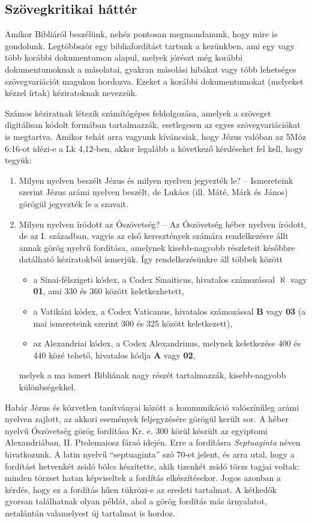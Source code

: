 \documentclass{article}
\begin{document}
\subsection{Szövegkritikai háttér}

Amikor Bibliáról beszélünk, nehéz pontosan megmondanunk, hogy mire is gondolunk. Legtöbbször
egy bibliafordítást tartunk a kezünkben, ami egy vagy több korábbi dokumentumon alapul,
melyek jórészt még korábbi dokumentumoknak a másolatai, gyakran másolási hibákat vagy
több lehetséges szövegvariációt magukon hordozva. Ezeket a korábbi dokumentumokat
(melyeket kézzel írtak) kéziratoknak nevezzük.

Számos kéziratnak létezik számítógépes feldolgozása, amelyek a szöveget
digitálisan kódolt formában tartalmazzák, esetlegesen az egyes szövegvariációkat
is megtartva. Amikor tehát arra vagyunk kíváncsiak, hogy Jézus valóban az 5Móz 6:16-ot idézi-e
a Lk 4,12-ben, akkor legalább a következő kérdéseket fel kell, hogy tegyük:
\begin{enumerate}
\item Milyen nyelven beszélt Jézus és milyen nyelven jegyezték le? -- Ismereteink szerint
Jézus arámi nyelven beszélt, de Lukács (ill. Máté, Márk és János) görögül jegyezték le a szavait.
\item Milyen nyelven íródott az Ószövetség? -- Az Ószövetség héber nyelven íródott,
de az I. században, vagyis az első keresztények számára rendelkezésre állt annak
görög nyelvű fordítása, amelynek kisebb-nagyobb részleteit későbbre datálható kéziratokból
ismerjük. Így rendelkezésünkre áll többek között
\begin{itemize}
\item a Sínai-félszigeti kódex,
a Codex Sinaiticus, hivatalos számozással $\boldsymbol{\aleph}$ vagy \textbf{01}, ami 330 és 360 között keletkezhetett,
\item a Vatikáni kódex, a Codex Vaticanus, hivatalos számozással \textbf{B} vagy \textbf{03} (a mai ismereteink szerint 300 és 325 között keletkezett),
\item az Alexandriai kódex, a Codex Alexandrinus, melynek keletkezése 400 és 440 közé tehető,
hivatalos kódja \textbf{A} vagy \textbf{02},
\end{itemize}
melyek a ma ismert Bibliának nagy részét tartalmazzák, kisebb-nagyobb különbségekkel.
\end{enumerate}
Habár Jézus és közvetlen tanítványai között a kommunikáció valószínűleg arámi nyelven zajlott,
az akkori események feljegyzésére görögül került sor. A héber nyelvű Ószövetség
görög fordítása Kr. e. 300 körül készült az egyiptomi Alexandriában, II. Ptolemaiosz fáraó idején.
Erre a fordításra \textit{Septuaginta} néven hivatkozunk.
A latin nyelvű ``septuaginta'' szó 70-et jelent, és arra utal, hogy a fordítást hetvenkét zsidó bölcs
készítette, akik tizenkét zsidó törzs tagjai voltak: minden törzset hatan képviseltek a fordítás elkészítésekor.
Jogos azonban a kérdés, hogy ez a fordítás hűen tükrözi-e az eredeti tartalmat. A kétkedők
gyorsan találhatnak olyan példát, ahol a görög fordítás más árnyalatot, netalántán valamelyest
új tartalmat is hordoz.
\end{document}
